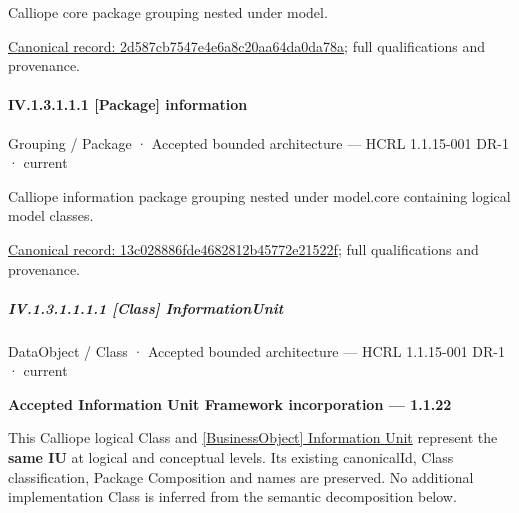 Calliope core package grouping nested under model.


{\footnotesize \href{../../../../../../../continuum/grouping/package/2d587cb7547e4e6a8c20aa64da0da78a.md}{Canonical record: 2d587cb7547e4e6a8c20aa64da0da78a}; full qualifications and provenance.}\par
\paragraph*{IV.1.3.1.1.1 [Package] information}
\label{navigation:IV.1.3.1.1.1}

\label{element:13c028886fde4682812b45772e21522f}
{\small Grouping / Package · Accepted bounded architecture — HCRL 1.1.15-001 DR-1 · current}\par

Calliope information package grouping nested under model.core containing logical model classes.


{\footnotesize \href{../../../../../../../continuum/grouping/package/13c028886fde4682812b45772e21522f.md}{Canonical record: 13c028886fde4682812b45772e21522f}; full qualifications and provenance.}\par
\subparagraph*{IV.1.3.1.1.1.1 [Class] InformationUnit}
\label{navigation:IV.1.3.1.1.1.1}

\label{element:74ec609de1ae498fbf9d13e4ef8c6cbe}
{\small DataObject / Class · Accepted bounded architecture — HCRL 1.1.15-001 DR-1 · current}\par

\par\medskip\textbf{Accepted Information Unit Framework incorporation — 1.1.22}\par


This Calliope logical Class and \hyperref[element:10284034c8534b639284386b064f2c54]{[BusinessObject] Information Unit} represent the \textbf{same IU} at
logical and conceptual levels. Its existing canonicalId, Class classification,
Package Composition and names are preserved. No additional implementation Class
is inferred from the semantic decomposition below.




